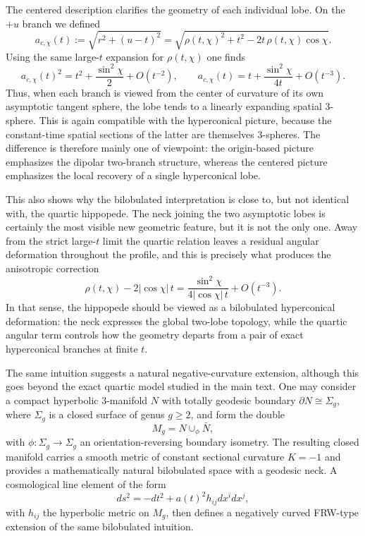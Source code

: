 \documentclass[11pt]{article}
\begin{document}
The centered description clarifies the geometry of each individual lobe. On the $+u$ branch we defined
\begin{equation}
a_{c,\chi}(t):=\sqrt{r^2+(u-t)^2}
=\sqrt{\rho(t,\chi)^2+t^2-2t\,\rho(t,\chi)\cos\chi}.
\end{equation}
Using the same large-$t$ expansion for $\rho(t,\chi)$ one finds
\begin{equation}
a_{c,\chi}(t)^2
=t^2+\frac{\sin^2\chi}{2}+O(t^{-2}),
\qquad
a_{c,\chi}(t)
=t+\frac{\sin^2\chi}{4t}+O(t^{-3}).
\end{equation}
Thus, when each branch is viewed from the center of curvature of its own asymptotic tangent sphere, the lobe tends to a linearly expanding spatial $3$-sphere. This is again compatible with the hyperconical picture, because the constant-time spatial sections of the latter are themselves $3$-spheres. The difference is therefore mainly one of viewpoint: the origin-based picture emphasizes the dipolar two-branch structure, whereas the centered picture emphasizes the local recovery of a single hyperconical lobe.

This also shows why the bilobulated interpretation is close to, but not identical with, the quartic hippopede. The neck joining the two asymptotic lobes is certainly the most visible new geometric feature, but it is not the only one. Away from the strict large-$t$ limit the quartic relation leaves a residual angular deformation throughout the profile, and this is precisely what produces the anisotropic correction
\begin{equation}
\rho(t,\chi)-2|{\cos\chi}|\,t
=\frac{\sin^2\chi}{4|{\cos\chi}|\,t}+O(t^{-3}).
\end{equation}
In that sense, the hippopede should be viewed as a bilobulated hyperconical deformation: the neck expresses the global two-lobe topology, while the quartic angular term controls how the geometry departs from a pair of exact hyperconical branches at finite $t$.

The same intuition suggests a natural negative-curvature extension, although this goes beyond the exact quartic model studied in the main text. One may consider a compact hyperbolic $3$-manifold $N$ with totally geodesic boundary $\partial N\cong\Sigma_g$, where $\Sigma_g$ is a closed surface of genus $g\ge2$, and form the double
\begin{equation}
M_g=N\cup_{\phi}\bar N,
\end{equation}
with $\phi:\Sigma_g\to\Sigma_g$ an orientation-reversing boundary isometry. The resulting closed manifold carries a smooth metric of constant sectional curvature $K=-1$ and provides a mathematically natural bilobulated space with a geodesic neck. A cosmological line element of the form
\begin{equation}
ds^2=-dt^2+a(t)^2 h_{ij}dx^i dx^j,
\end{equation}
with $h_{ij}$ the hyperbolic metric on $M_g$, then defines a negatively curved FRW-type extension of the same bilobulated intuition.
\end{document}
